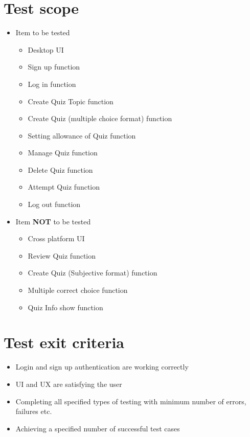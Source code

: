 \documentclass[ 10pt]{report}
\begin{document}
    \section{Test scope}
    \begin{itemize}
        \item Item to be tested \begin{itemize}
            \item Desktop UI
            \item Sign up function
            \item Log in function
            \item Create Quiz Topic function
            \item Create Quiz (multiple choice format) function
            \item Setting allowance of Quiz function
            \item Manage Quiz function
            \item Delete Quiz function
            \item Attempt Quiz function
            \item Log out function
        \end{itemize}
        \item Item \textbf{NOT} to be tested \begin{itemize}
            \item Cross platform UI
            \item Review Quiz function
            \item Create Quiz (Subjective format) function
            \item Multiple correct choice function
            \item Quiz Info show function
        \end{itemize}
    \end{itemize}
    \section{Test exit criteria}
    \begin{itemize}
        \item Login and sign up authentication are working correctly
        \item UI and UX are satisfying the user
        \item Completing all specified types of testing with minimum number of errors, failures etc.
        \item Achieving a specified number of successful test cases
    \end{itemize}
\end{document}
